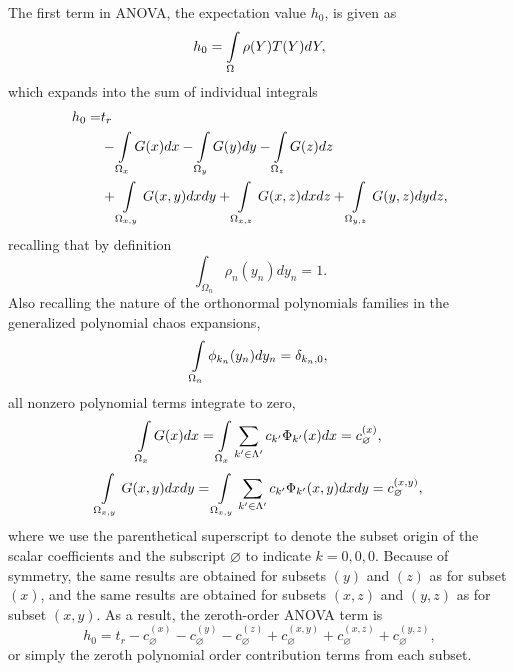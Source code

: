 The first term in ANOVA, the expectation value $h_0$, is given as
\begin{equation}
  h_0 = \int\limits_{\Omega} \rho(Y) T(Y) dY,
\end{equation}
which expands into the sum of individual integrals
\begin{align}
  h_0 =& t_r \\ \nonumber
  &- \int\limits_{\Omega_{x}} G(x) dx - \int\limits_{\Omega_{y}} G(y) dy - \int\limits_{\Omega_{z}} G(z) dz \\ \nonumber
  &+ \int\limits_{\Omega_{x,y}} G(x,y) dx dy + \int\limits_{\Omega_{x,z}} G(x,z) dx dz + \int\limits_{\Omega_{y,z}} G(y,z) dy dz,
\end{align}
recalling that by definition
\begin{equation}
\int_{\Omega_n} \rho_n(y_n) dy_n = 1.
\end{equation}
Also recalling the nature of the orthonormal polynomials families in the generalized polynomial chaos expansions,
\begin{equation}
  \int\limits_{\Omega_n} \phi_{k_n}(y_n) dy_n = \delta_{k_n,0},
\end{equation}
all nonzero polynomial terms integrate to zero,
\begin{equation}
  \int\limits_{\Omega_{x}} G(x) dx = \int\limits_{\Omega_{x}} \sum_{k'\in\Lambda'}c_{k'}\Phi_{k'}(x) dx = c_\varnothing^{(x)},
\end{equation}
\begin{equation}
  \int\limits_{\Omega_{x,y}} G(x,y) dxdy = \int\limits_{\Omega_{x,y}} \sum_{k'\in\Lambda'}c_{k'}\Phi_{k'}(x,y) dxdy = c_\varnothing^{(x,y)},
\end{equation}
where we use the parenthetical superscript to denote the subset origin of the scalar coefficients and the
subscript $\varnothing$ to indicate $k={0,0,0}$.  Because of
symmetry, the same results are obtained for subsets $(y)$ and $(z)$ as for subset $(x)$, and the same results are obtained for
subsets $(x,z)$ and $(y,z)$ as for subset $(x,y)$.  As a result, the zeroth-order ANOVA term is
\begin{equation}
  h_0 = t_r - c_\varnothing^{(x)} - c_\varnothing^{(y)} - c_\varnothing^{(z)} + c_\varnothing^{(x,y)} +
           c_\varnothing^{(x,z)} + c_\varnothing^{(y,z)}, 
\end{equation}
or simply the zeroth polynomial order contribution terms from each subset.

